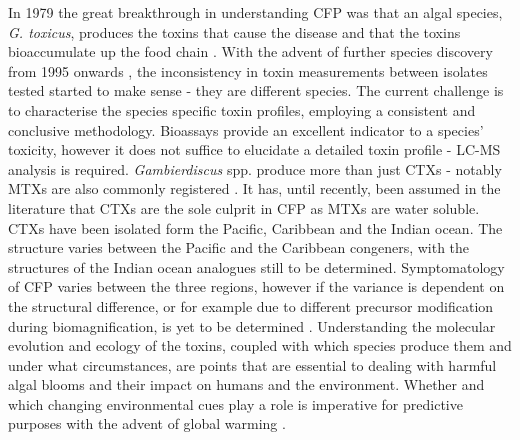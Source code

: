 \documentclass[12pt]{article}
\begin{document}
In 1979 the great breakthrough in understanding CFP was that an algal species, \emph{G. toxicus}, produces the toxins that cause the disease and that the toxins bioaccumulate up the food chain \citep{adachi1979thecal}. With the advent of further species discovery from 1995 onwards \citep{faust1995observation}, the inconsistency in toxin measurements between isolates tested started to make sense - they are different species. The current challenge is to characterise the species specific toxin profiles, employing a consistent and conclusive methodology. Bioassays provide an excellent indicator to a species' toxicity, however it does not suffice to elucidate a detailed toxin profile - LC-MS analysis is required. \emph{Gambierdiscus} spp. produce more than just CTXs - notably MTXs are also commonly registered \citep{holmes1994purification,murata1993structure}. It has, until recently, been assumed in the literature that CTXs are the sole culprit in CFP as MTXs are water soluble. CTXs have been isolated form the Pacific, Caribbean and the Indian ocean. The  structure varies between the Pacific and the Caribbean congeners, with the structures of the Indian ocean analogues still to be determined. Symptomatology of CFP varies between the three regions, however if the variance is dependent on  the structural difference, or for example due to different precursor modification during biomagnification, is yet to be determined \citep{lewis2006ciguatera}. Understanding the molecular evolution and ecology of the toxins, coupled with which species produce them and under what circumstances, are points that are essential to dealing with harmful algal blooms and their impact on humans and the environment. Whether and which changing environmental cues play a role is imperative for predictive purposes with the advent of global warming \citep{llewellyn2010revisiting}.  \\
\end{document}
